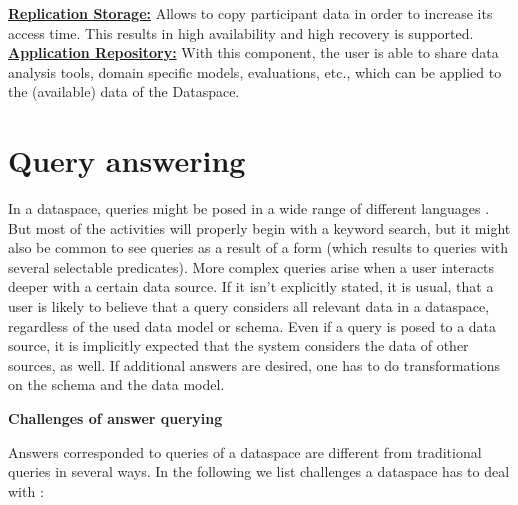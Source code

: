 \uline{\textbf{Replication Storage:}} Allows to copy participant data in order to increase its access time. This results in high availability and high recovery is supported.\\

\uline{\textbf{Application Repository:}} With this component, the user is able to share data analysis tools, domain specific models, evaluations, etc., which can be applied to the (available) data of the Dataspace.\\


\section{Query answering}

In a dataspace, queries might be posed in a wide range of different languages \cite[p. 3]{Halevy:2006:PDS:1142351.1142352}. But most of the activities will properly begin with a keyword search, but it might also be common to see queries as a result of a form (which results to queries with several selectable predicates). More complex queries arise when a user interacts deeper with a certain data source. If it isn't explicitly stated, it is usual, that a user is likely to believe that a query considers all relevant data in a dataspace, regardless of the used data model or schema. Even if a query is posed to a data source, it is implicitly expected that the system considers the data of other sources, as well. If additional answers are desired, one has to do transformations on the schema and the data model.

\textbf{Challenges of answer querying}

Answers corresponded to queries of a dataspace are different from traditional queries in several ways. In the following we list challenges a dataspace has to deal with \cite[p. 3-4]{Halevy:2006:PDS:1142351.1142352}:

